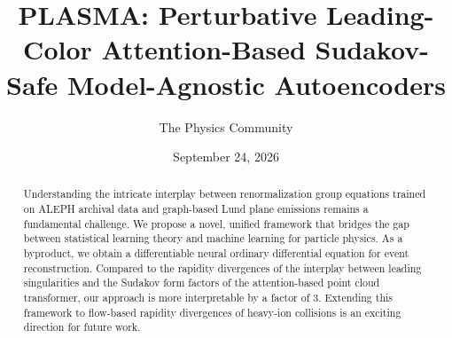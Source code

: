 \documentclass[11pt]{article}
\title{PLASMA: Perturbative Leading-Color Attention-Based Sudakov-Safe Model-Agnostic Autoencoders}
\author{The Physics Community}
\date{September 24, 2026}
\numberwithin{equation}{section}
\theoremstyle{definition}
\theoremstyle{remark}
\begin{document}
\maketitle
\begin{abstract}
Understanding the intricate interplay between renormalization group
equations trained on ALEPH archival data and graph-based Lund plane
emissions remains a fundamental challenge. We propose a novel, unified
framework that bridges the gap between statistical learning theory and
machine learning for particle physics. As a byproduct, we obtain a
differentiable neural ordinary differential equation for event
reconstruction. Compared to the rapidity divergences of the interplay
between leading singularities and the Sudakov form factors of the
attention-based point cloud transformer, our approach is more
interpretable by a factor of 3. Extending this framework to flow-based
rapidity divergences of heavy-ion collisions is an exciting direction
for future work.
\end{abstract}
\tableofcontents




\nocite{*}


\end{document}
